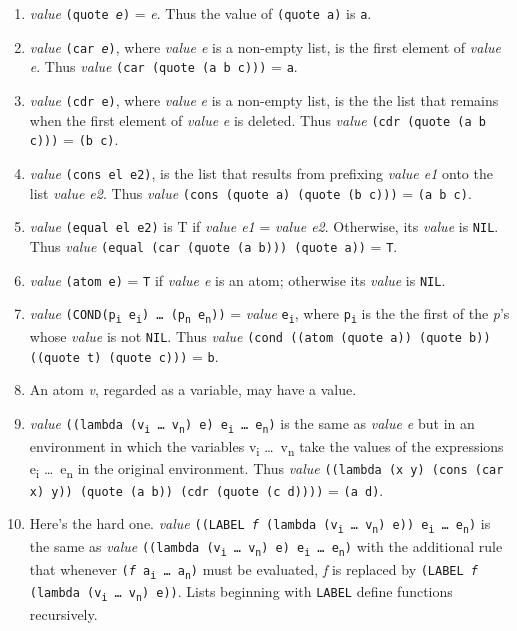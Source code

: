 \documentclass[8pt,letter,twocolumn]{article}
\newcommand{\args}[1] {#1\textsubscript{i} \dots \ #1\textsubscript{n}}
\newcommand{\ei}[0] {e\textsubscript{i}}
\newcommand{\en}[0] {e\textsubscript{n}}
\begin{document}
\begin{enumerate}
\setlength\itemsep{0em}
\item \textit{value} \texttt{(quote \textit{e})} = \textit{e}. Thus the value of
  \texttt{(quote a)} is \texttt{a}.

\item \textit{value} \texttt{(car \textit{e})}, where \textit{value e} is a
  non-empty list, is the first element of \textit{value e}. Thus \textit{value}
  \texttt{(car (quote (a b c)))} = \texttt{a}.

\item \textit{value} \texttt{(cdr e)}, where \textit{value} \textit{e} is a
  non-empty list, is the the list that remains when the first element of
  \textit{value} \textit{e} is deleted. Thus \textit{value} \texttt{(cdr (quote
    (a b c)))} = \texttt{(b c)}.

\item \textit{value} \texttt{(cons el e2)}, is the list that results from
  prefixing \textit{value e1} onto the list \textit{value e2}. Thus
  \textit{value} \texttt{(cons (quote a) (quote (b c)))} = \texttt{(a b c)}.

\item \textit{value} \texttt{(equal el e2)} is T if \textit{value e1} =
  \textit{value e2}. Otherwise, its \textit{value} is \texttt{NIL}. Thus
  \textit{value} \texttt{(equal (car (quote (a b))) (quote a))} = \texttt{T}.

\item \textit{value} \texttt{(atom e)} = \texttt{T} if \textit{value e} is an
  atom; otherwise its \textit{value} is \texttt{NIL}.

\item \textit{value} \texttt{(COND(p\textsubscript{i} \ei) \dots
    (p\textsubscript{n} \en))} = \textit{value} \texttt{\ei}, where
  \texttt{p\textsubscript{i}} is the the first of the \textit{p}\rq s whose
  \textit{value} is not \texttt{NIL}. Thus \textit{value} \texttt{(cond ((atom
    (quote a)) (quote b)) ((quote t) (quote c)))} = \texttt{b}.

\item An atom \textit{v}, regarded as a variable, may have a value.

\item \textit{value} \texttt{((lambda (\args{v}) e) \args{e})} is the same as
  \textit{value e} but in an environment in which the variables \args{v} take
  the values of the expressions \args{e} in the original environment. Thus
  \textit{value} \texttt{((lambda (x y) (cons (car x) y)) (quote (a b)) (cdr
    (quote (c d))))} = \texttt{(a d)}.

\item Here\rq s the hard one. \textit{value} \texttt{((LABEL \textit{f} (lambda
    (\args{v}) e)) \args{e})} is the same as \textit{value} \texttt{((lambda
    (\args{v}) e) \args{e})} with the additional rule that whenever
  \texttt{(\textit{f} \args{a})} must be evaluated, \textit{f} is replaced by
  \texttt{(LABEL \textit{f} (lambda (\args{v}) e))}. Lists beginning with
  \texttt{LABEL} define functions recursively.

\end{enumerate}
\end{document}

